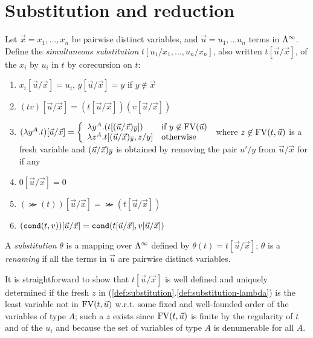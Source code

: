 \section{Substitution and reduction}\label{sec:reduction}


\medskip
\begin{definition}[Substitution]\label{def:substitution}
Let $\vec{x} = x_1, \ldots , x_n$ be pairwise distinct variables, and $\vec{u} = u_1, \ldots u_n$ terms in $\Lambda^\infty$. 
Define the {\em simultaneous substitution} $t[u_1/x_1,\ldots,u_n/x_n]$, also written $t[\vec{u}/{\vec{x}}]$, of the $x_i$ by $u_i$ in $t$
by corecursion on $t$:
\begin{enumerate}
\item $x_i [\vec{u}/{\vec{x}}] = u_i$, $y [\vec{u}/{\vec{x}}] = y$ if $y \not\in \vec{x}$
\item $(t v)[\vec{u}/{\vec{x}}] = (t [\vec{u}/{\vec{x}}])(v [\vec{u}/{\vec{x}}])$  \vspace{1mm}
\item \label{def:substitution-lambda}
         $(\lambda y^A.t) [\vec{u}/{\vec{x}}] = %
		\left\{ \begin{array}{ll}
		\lambda y^A. (t [\Restrict{(\vec{u}/\vec{x})}{\overline{y}}]) & \mbox{if $y \not \in \FV(\vec{u})$} \\
		\lambda z^A. t [\Restrict{(\vec{u}/\vec{x})}{\overline{y}}, z/y] & \mbox{otherwise}
		\end{array}\right.$
	where $z \not \in {{\rm FV}}(t,\vec{u})$ is a fresh variable and $(\vec{u}/\vec{x})_{\overline{y}}$ 
	is obtained by removing the pair $u'/y$ from $\vec{u}/{\vec{x}}$ for if any
\item $0  [\vec{u}/{\vec{x}}] = 0$
\item $(\Succ(t)) [\vec{u}/{\vec{x}}] = \Succ (t [\vec{u}/{\vec{x}}])$
\item $({\tt cond}(t,v)) [\vec{u}/{\vec{x}}] = {\tt cond}(t [\vec{u}/{\vec{x}}], v [\vec{u}/{\vec{x}}])$
\end{enumerate}
A {\em substitution} $\theta$ is a mapping over $\Lambda^\infty$ defined by $\theta(t) = t[\vec{u}/{\vec{x}}]$; $\theta$ is a {\em renaming} if all
the terms in $\vec{u}$ are pairwise distinct variables.
\end{definition}

It is straightforward to show that $t[\vec{u}/{\vec{x}}]$ is well defined and uniquely determined if the
fresh $z$ in (\ref{def:substitution}.\ref{def:substitution-lambda}) is the least variable not in ${{\rm FV}}(t,\vec{u})$ w.r.t. some fixed and
well-founded order of the variables of type $A$; such a $z$ exists since ${{\rm FV}}(t,\vec{u})$ is finite by the regularity of $t$ and of the $u_i$ and
because the set of variables of type $A$ is denumerable for all $A$. 

